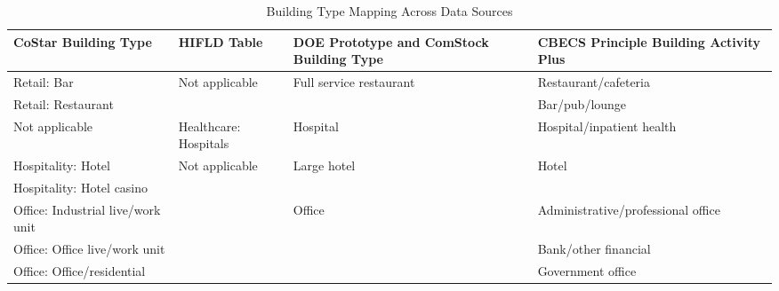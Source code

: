 \begin{table}
\centering
\small
\caption[Building Type Mapping Across Data Sources]{Building Type Mapping Across Data Sources}
\label{tab:building_types}
\begin{tabular}{|p{4.25cm}|p{3.5cm}|p{3.25cm}|p{4.25cm}|}
\hline
\textbf{CoStar Building   Type}                                & \multicolumn{1}{l|}{\textbf{HIFLD Table}}                & \textbf{DOE Prototype and ComStock Building Type}                               & \textbf{CBECS Principle Building Activity Plus }         \\ \hline
Retail:   Bar                                         & \multirow{2}{*}{Not applicable}                 & \multirow{2}{*}{Full service restaurant}  & Restaurant/cafeteria                            \\ \cline{1-1} \cline{4-4} 
Retail: Restaurant                                    &                                                 &                                           & Bar/pub/lounge                                  \\ \hline
\multicolumn{1}{|l|}{Not applicable}                  & \multicolumn{1}{l|}{Healthcare: Hospitals}      & Hospital                                  & Hospital/inpatient health                       \\ \hline
Hospitality: Hotel                                    & \multirow{12}{*}{Not applicable}                & \multirow{2}{*}{Large hotel}              & \multirow{2}{*}{Hotel}                          \\ \cline{1-1}
Hospitality: Hotel casino                             &                                                 &                                           &                                                 \\ \cline{1-1} \cline{3-4} 
Office: Industrial live/work   unit                   &                                                 & \multirow{6}{*}{Office}                   & Administrative/professional office              \\ \cline{1-1} \cline{4-4} 
Office: Office live/work unit                         &                                                 &                                           & Bank/other financial                            \\ \cline{1-1} \cline{4-4} 
Office: Office/residential                            &                                                 &                                           & Government office                               \\ \cline{1-1} \cline{4-4} 

\end{tabular}
\end{table}
